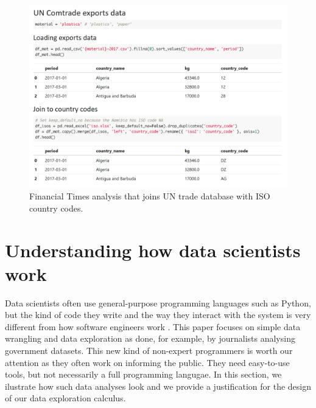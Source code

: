 \documentclass[english,submission]{programming}
\theoremstyle{plain}
\theoremstyle{definition}
\begin{document}

\begin{figure}
\vspace{-1em}
\hspace{1em}\includegraphics[scale=0.52]{figures/notebook.png}
\vspace{-0.5em}
\caption{Financial Times analysis that joins UN trade database with ISO country codes.}
\label{fig:ft-uncomtrade}
\vspace{-0.5em}
\end{figure}


\section{Understanding how data scientists work}
\label{sec:background}

Data scientists often use general-purpose programming languages such as Python, but the kind of
code they write and the way they interact with the system is very different from how software
engineers work \cite{workflow}. This paper focuses on simple data wrangling and data exploration as
done, for example, by journalists analysing government datasets. This new kind of non-expert
programmers is worth our attention as they often work on informing the public. They need easy-to-use
tools, but not necessarily a full programming langugae. In this section, we ilustrate how such
data analyses look and we provide a justification for the design of our data exploration calculus.
\end{document}
